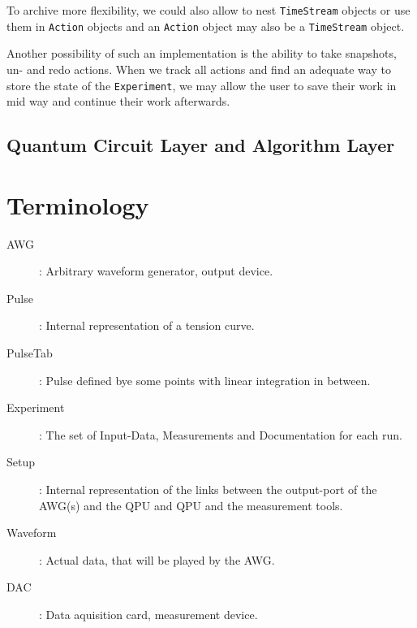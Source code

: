 \documentclass[a4paper,12pt]{article}
\begin{document}
To archive more flexibility, we could also allow to nest \texttt{TimeStream} objects or use them in \texttt{Action} objects and an \texttt{Action} object may also be a \texttt{TimeStream} object.

Another possibility of such an implementation is the ability to take snapshots, un- and redo actions. When we track all actions and find an adequate way to store the state of the \texttt{Experiment}, we may allow the user to save their work in mid way and continue their work afterwards.

\subsection{Quantum Circuit Layer and Algorithm Layer}

\section{Terminology}
 \begin{description}
  \item[AWG]: Arbitrary waveform generator, output device.
  \item[Pulse]: Internal representation of a tension curve.
  \item[PulseTab]: Pulse defined bye some points with linear integration in between.
  \item[Experiment]: The set of Input-Data, Measurements and Documentation for each run.
  \item[Setup]: Internal representation of the links between the output-port of the AWG(s) and the QPU and QPU and the measurement tools.
  \item[Waveform]: Actual data, that will be played by the AWG. 
  \item[DAC]: Data aquisition card, measurement device.
 \end{description}
\end{document}
